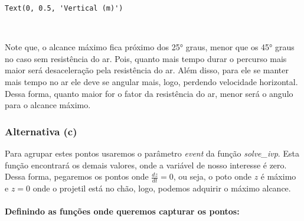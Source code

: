\documentclass[12pt]{article}
\makeatletter
\newcommand{\boxspacing}{\kern\kvtcb@left@rule\kern\kvtcb@boxsep}
\newcommand{\prompt}[4]{
        {\ttfamily\llap{{\color{#2}[#3]:\hspace{3pt}#4}}\vspace{-\baselineskip}}
    }
\makeatother
\begin{document}
            \begin{tcolorbox}[breakable, size=fbox, boxrule=.5pt, pad at break*=1mm, opacityfill=0]
\prompt{Out}{outcolor}{8}{\boxspacing}
\begin{Verbatim}[commandchars=\\\{\}]
Text(0, 0.5, 'Vertical (m)')
\end{Verbatim}
\end{tcolorbox}
        
    \begin{center}
    \end{center}
    { \hspace*{\fill} \\}
    
    Note que, o alcance máximo fica próximo dos 25° graus, menor que os 45°
graus no caso sem resistência do ar. Pois, quanto mais tempo durar o
percurso mais maior será desaceleração pela resistência do ar. Além
disso, para ele se manter mais tempo no ar ele deve se angular mais,
logo, perdendo velocidade horizontal. Dessa forma, quanto maior for o
fator da resistência do ar, menor será o angulo para o alcance máximo.

\hypertarget{alternativa-c}{%
\subsubsection{Alternativa (c)}\label{alternativa-c}}

Para agrupar estes pontos usaremos o parâmetro \emph{event} da função
\emph{solve\_ivp}. Esta função encontrará os demais valores, onde a
variável de nosso interesse é zero. Dessa forma, pegaremos os pontos
onde \(\frac{dz}{dt}=0\), ou seja, o poto onde \(z\) é máximo e \(z=0\)
onde o projetil está no chão, logo, podemos adquirir o máximo alcance.

\hypertarget{definindo-as-funuxe7uxf5es-onde-queremos-capturar-os-pontos}{%
\paragraph{Definindo as funções onde queremos capturar os
pontos:}\label{definindo-as-funuxe7uxf5es-onde-queremos-capturar-os-pontos}}
\end{document}
